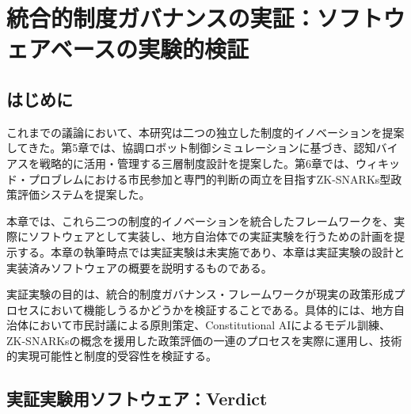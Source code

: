 
\chapter{統合的制度ガバナンスの実証：ソフトウェアベースの実験的検証}
\label{chap:integrated_governance}

\begin{center}
\end{center}

\vspace{1em}

\section{はじめに}
\label{sec:ch_integrated_intro}

これまでの議論において、本研究は二つの独立した制度的イノベーションを提案してきた。第5章では、協調ロボット制御シミュレーションに基づき、認知バイアスを戦略的に活用・管理する三層制度設計を提案した。第6章では、ウィキッド・プロブレムにおける市民参加と専門的判断の両立を目指すZK-SNARKs型政策評価システムを提案した。

本章では、これら二つの制度的イノベーションを統合したフレームワークを、実際にソフトウェアとして実装し、地方自治体での実証実験を行うための計画を提示する。本章の執筆時点では実証実験は未実施であり、本章は実証実験の設計と実装済みソフトウェアの概要を説明するものである。

実証実験の目的は、統合的制度ガバナンス・フレームワークが現実の政策形成プロセスにおいて機能しうるかどうかを検証することである。具体的には、地方自治体において市民討議による原則策定、Constitutional AIによるモデル訓練、ZK-SNARKsの概念を援用した政策評価の一連のプロセスを実際に運用し、技術的実現可能性と制度的受容性を検証する。

\section{実証実験用ソフトウェア：Verdict}
\label{sec:ch_integrated_verdict}

